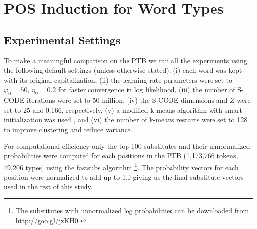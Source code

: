 \section{POS Induction for Word Types}
\label{sec:types}

\subsection{Experimental Settings}\label{sec:expset}

To make a meaningful comparison on the PTB we ran all the experiments
using the following default settings (unless otherwise stated): (i)
each word was kept with its original capitalization, (ii) the learning
rate parameters were set to $\varphi_0=50$, $\eta_0=0.2$ for faster
convergence in log likelihood, (iii) the number of S-CODE iterations
were set to 50 million, (iv) the S-CODE dimensions and $Z$ were set to
25 and 0.166, respectively, (v) a modified k-means algorithm with
smart initialization was used \cite{arthur2007k}, and (vi) the number
of k-means restarts were set to 128 to improve clustering and reduce
variance.

For computational efficiency only the top 100 substitutes and their
unnormalized probabilities were computed for each positions in the PTB
(1,173,766 tokens, 49,206 types) using the {\sc fastsubs} algorithm
\cite{yuret2012fastsub}\footnote{The substitutes with unnormalized log
  probabilities can be downloaded from
  \mbox{\url{http://goo.gl/jzKH0}}.}.  The probability vectors for
each position were normalized to add up to 1.0 giving us the final
substitute vectors used in the rest of this study.


